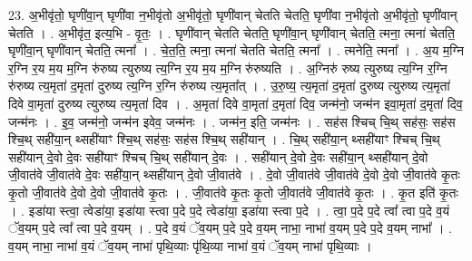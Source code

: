 \documentclass[17pt]{extarticle}
\begin{document}
23. अ॒भीवृ॑तो॒ घृणी॑वा॒न् घृणी॑वा न॒भीवृ॑तो अ॒भीवृ॑तो॒ घृणी॑वान् चेतति चेतति॒ घृणी॑वा न॒भीवृ॑तो अ॒भीवृ॑तो॒ घृणी॑वान् चेतति । . अ॒भीवृ॑त॒ इत्य॒भि - वृ॒तः॒ । . घृणी॑वान् चेतति चेतति॒ घृणी॑वा॒न् घृणी॑वान् चेतति॒ त्मना॒ त्मना॑ चेतति॒ घृणी॑वा॒न् घृणी॑वान् चेतति॒ त्मना᳚ । . चे॒त॒ति॒ त्मना॒ त्मना॑ चेतति चेतति॒ त्मना᳚ । . त्मनेति॒ त्मना᳚ । . अ॒य म॒ग्नि र॒ग्नि र॒य म॒य म॒ग्नि रु॑रुष्य त्युरुष्य त्य॒ग्नि र॒य म॒य म॒ग्नि रु॑रुष्यति । . अ॒ग्निरु॑ रुष्य त्युरुष्य त्य॒ग्नि र॒ग्नि रु॑रुष्य त्य॒मृता॑ द॒मृता॑ दुरुष्य त्य॒ग्नि र॒ग्नि रु॑रुष्य त्य॒मृता᳚त् । . उ॒रु॒ष्य॒ त्य॒मृता॑ द॒मृता॑ दुरुष्य त्युरुष्य त्य॒मृता॑ दिवे वा॒मृता॑ दुरुष्य त्युरुष्य त्य॒मृता॑ दिव । . अ॒मृता॑ दिवे वा॒मृता॑ द॒मृता॑ दिव॒ जन्म॑नो॒ जन्म॑न इवा॒मृता॑ द॒मृता॑ दिव॒ जन्म॑नः । . इ॒व॒ जन्म॑नो॒ जन्म॑न इवेव॒ जन्म॑नः । . जन्म॑न॒ इति॒ जन्म॑नः । . सह॑स श्चिच् चि॒थ् सह॑सः॒ सह॑स श्चि॒थ् सही॑या॒न् थ्सही॑याꣳ श्चि॒थ् सह॑सः॒ सह॑स श्चि॒थ् सही॑यान् । . चि॒थ् सही॑या॒न् थ्सही॑याꣳ श्चिच् चि॒थ् सही॑यान् दे॒वो दे॒वः सही॑याꣳ श्चिच् चि॒थ् सही॑यान् दे॒वः । . सही॑यान् दे॒वो दे॒वः सही॑या॒न् थ्सही॑यान् दे॒वो जी॒वात॑वे जी॒वात॑वे दे॒वः सही॑या॒न् थ्सही॑यान् दे॒वो जी॒वात॑वे । . दे॒वो जी॒वात॑वे जी॒वात॑वे दे॒वो दे॒वो जी॒वात॑वे कृ॒तः कृ॒तो जी॒वात॑वे दे॒वो दे॒वो जी॒वात॑वे कृ॒तः । . जी॒वात॑वे कृ॒तः कृ॒तो जी॒वात॑वे जी॒वात॑वे कृ॒तः । . कृ॒त इति॑ कृ॒तः । . इडा॑या स्त्वा॒ त्वेडा॑या॒ इडा॑या स्त्वा प॒दे प॒दे त्वेडा॑या॒ इडा॑या स्त्वा प॒दे । . त्वा॒ प॒दे प॒दे त्वा᳚ त्वा प॒दे व॒यं ॅव॒यम् प॒दे त्वा᳚ त्वा प॒दे व॒यम् । . प॒दे व॒यं ॅव॒यम् प॒दे प॒दे व॒यम् नाभा॒ नाभा॑ व॒यम् प॒दे प॒दे व॒यम् नाभा᳚ । . व॒यम् नाभा॒ नाभा॑ व॒यं ॅव॒यम् नाभा॑ पृथि॒व्याः पृ॑थि॒व्या नाभा॑ व॒यं ॅव॒यम् नाभा॑ पृथि॒व्याः । \newline
\end{document}
